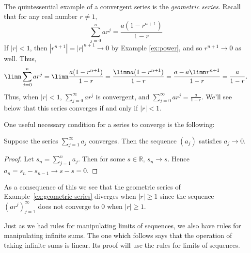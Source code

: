 \documentclass[11pt,dvipsnames]{book}
\numberwithin{figure}{section} %
\numberwithin{table}{section} %
\begin{document}
\begin{example}
\label{ex:geometric-series}
The quintessential example of a convergent series is the {\it geometric series}. Recall that for any real number $r \neq 1$,
\begin{equation}
\sum_{j=0}^{n} ar ^{j}=\frac{a(1-r^{n+1})}{1-r}
\end{equation}
If $|r|<1$, then $|r^{n+1}|=|r|^{n+1}\rightarrow 0$ by Example \ref{ex:power}, and so $r^{n+1}\rightarrow 0$ as well. Thus,
\[
\limn \sum_{j=0}^{n}ar^{j} = \limn \frac{a(1-r^{n+1})}{1-r} = \frac{\limn a(1-r^{n+1})}{1-r}=\frac{a- a\limn r^{n+1}}{1-r}=\frac{a}{1-r}.\]
Thus, when $|r|<1$, $\sum_{j=0}^\infty a r^{j}$ is convergent, and $\sum_{j=0}^{\infty} a r^{j}=\frac{a}{1-r}$. We'll see below that this series converges if and only if $|r|<1$.\\
%
\end{example}

One useful necessary condition for a series to converge is the following:

\begin{proposition}\label{divgcetest}
Suppose the series $\sum_{j=1}^\infty a_j$ converges. Then the sequence $(a_j)$ satisfies $a_j \to 0$.
\end{proposition}
\begin{proof}
Let $s_n = \sum_{j=1}^n a_j$. Then for some $s \in \mathbb{R}$, $s_n \to s$. Hence $a_n = s_n - s_{n-1} \to s-s =0$.
\end{proof}
As a consequence of this we see that the geometric series of Example~\ref{ex:geometric-series} diverges when $|r| \geq 1$ since the sequence $(ar^j)_{j=1}^\infty$ does not converge to $0$ when $|r| \geq 1$.

\medskip
Just as we had rules for manipulating limits of sequences, we also have rules for manipulating infinite sums. The one
which follows says that the operation of taking infinite sums is linear. Its proof  will use the rules for limits of sequences.
\end{document}
